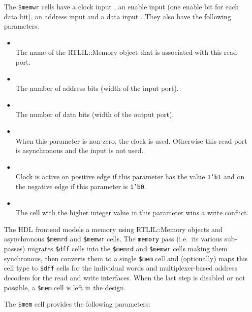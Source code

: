 The {\tt \$memwr} cells have a clock input , an enable input  (one
enable bit for each data bit), an address input  and a data input
. They also have the following parameters:

\begin{itemize}
\item {} \\
The name of the RTLIL::Memory object that is associated with this read port.

\item {} \\
The number of address bits (width of the  input port).

\item {} \\
The number of data bits (width of the  output port).

\item {} \\
When this parameter is non-zero, the clock is used. Otherwise this read port is asynchronous and
the  input is not used.

\item {} \\
Clock is active on positive edge if this parameter has the value {\tt 1'b1} and on the negative
edge if this parameter is {\tt 1'b0}.

\item {} \\
The cell with the higher integer value in this parameter wins a write conflict.
\end{itemize}

The HDL frontend models a memory using RTLIL::Memory objects and asynchronous
{\tt \$memrd} and {\tt \$memwr} cells. The {\tt memory} pass (i.e.~its various sub-passes) migrates
{\tt \$dff} cells into the {\tt \$memrd} and {\tt \$memwr} cells making them synchronous, then
converts them to a single {\tt \$mem} cell and (optionally) maps this cell type
to {\tt \$dff} cells for the individual words and multiplexer-based address decoders for the read and
write interfaces. When the last step is disabled or not possible, a {\tt \$mem} cell is left in the design.

The {\tt \$mem} cell provides the following parameters:

